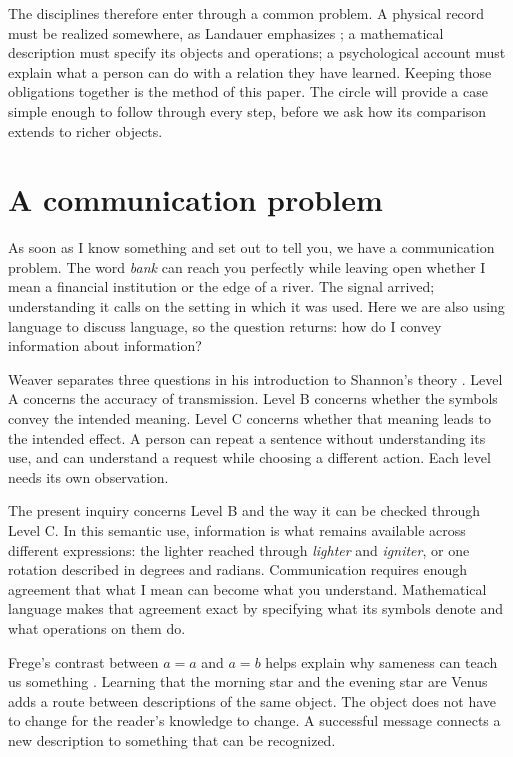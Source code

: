 \documentclass[11pt,a4paper]{article}
\begin{document}
The disciplines therefore enter through a common problem. A physical record
must be realized somewhere, as Landauer emphasizes \citep{Landauer1996}; a
mathematical description must specify its objects and operations; a psychological
account must explain what a person can do with a relation they have learned.
Keeping those obligations together is the method of this paper. The circle
will provide a case simple enough to follow through every step, before we ask
how its comparison extends to richer objects.

\section{A communication problem}
\label{sec:communication}

As soon as I know something and set out to tell you, we have a communication
problem. The word \emph{bank} can reach you perfectly while leaving open whether
I mean a financial institution or the edge of a river. The signal arrived;
understanding it calls on the setting in which it was used. Here we are also
using language to discuss language, so the question returns: how do I convey
information about information?

Weaver separates three questions in his introduction to Shannon's theory
\citep{Weaver1949}. Level A concerns the accuracy of transmission. Level B
concerns whether the symbols convey the intended meaning. Level C concerns
whether that meaning leads to the intended effect. A person can repeat a
sentence without understanding its use, and can understand a request while
choosing a different action. Each level needs its own observation.

The present inquiry concerns Level B and the way it can be checked through
Level C. In this semantic use, information is what remains available across
different expressions: the lighter reached through \emph{lighter} and
\emph{igniter}, or one rotation described in degrees and radians. Communication
requires enough agreement that what I mean can become what you understand.
Mathematical language makes that agreement exact by specifying what its
symbols denote and what operations on them do.

Frege's contrast between $a=a$ and $a=b$ helps explain why sameness can teach us
something \citep{Frege1892}. Learning that the morning star and the evening star
are Venus adds a route between descriptions of the same object. The object
does not have to change for the reader's knowledge to change. A successful
message connects a new description to something that can be recognized.
\end{document}
